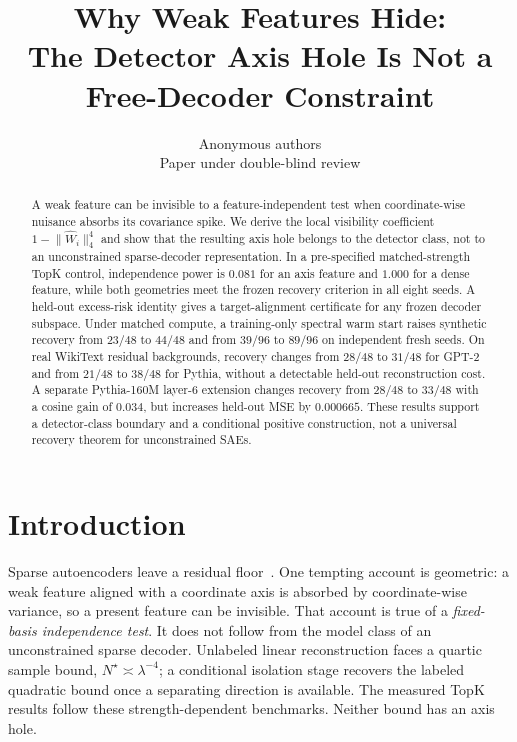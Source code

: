 \documentclass{article}
\title{Why Weak Features Hide:\\ The Detector Axis Hole Is Not a Free-Decoder Constraint}
\author{Anonymous authors\\Paper under double-blind review}
\theoremstyle{plain}
\newcommand{\Wihat}{\widehat{W}_i}
\begin{document}
\maketitle
{}

\begin{abstract}
 A weak feature can be invisible to a feature-independent test when coordinate-wise nuisance absorbs its covariance spike. We derive the local visibility coefficient $1-\lVert \Wihat\rVert_4^4$ and show that the resulting axis hole belongs to the detector class, not to an unconstrained sparse-decoder representation. In a pre-specified matched-strength TopK control, independence power is $0.081$ for an axis feature and $1.000$ for a dense feature, while both geometries meet the frozen recovery criterion in all eight seeds. A held-out excess-risk identity gives a target-alignment certificate for any frozen decoder subspace. Under matched compute, a training-only spectral warm start raises synthetic recovery from $23/48$ to $44/48$ and from $39/96$ to $89/96$ on independent fresh seeds. On real WikiText residual backgrounds, recovery changes from $28/48$ to $31/48$ for GPT-2 and from $21/48$ to $38/48$ for Pythia, without a detectable held-out reconstruction cost. A separate Pythia-160M layer-$6$ extension changes recovery from $28/48$ to $33/48$ with a cosine gain of $0.034$, but increases held-out MSE by $0.000665$. These results support a detector-class boundary and a conditional positive construction, not a universal recovery theorem for unconstrained SAEs.
\end{abstract}

\section{Introduction}
\label{sec:intro}

Sparse autoencoders leave a residual floor~\citep{gao2025scaling,engels2025dark}. One tempting account is geometric: a weak feature aligned with a coordinate axis is absorbed by coordinate-wise variance, so a present feature can be invisible. That account is true of a \emph{fixed-basis independence test}. It does not follow from the model class of an unconstrained sparse decoder. Unlabeled linear reconstruction faces a quartic sample bound, $N^\star\asymp\lambda^{-4}$; a conditional isolation stage recovers the labeled quadratic bound once a separating direction is available. The measured TopK results follow these strength-dependent benchmarks. Neither bound has an axis hole.
\end{document}
